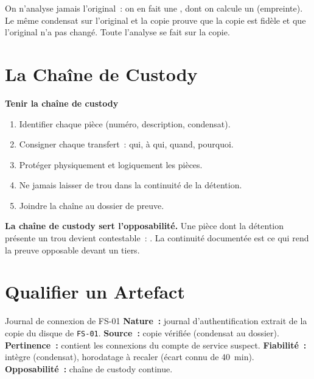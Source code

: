 On n'analyse jamais l'original~: on en fait une ,
dont on calcule un  (empreinte). Le même condensat sur
l'original et la copie prouve que la copie est fidèle et que l'original n'a
pas changé. Toute l'analyse se fait sur la copie.

\section{La Chaîne de Custody}
\label{sec:c11-custody}

\begin{boxprocedure}
\textbf{Tenir la chaîne de custody}
\begin{enumerate}
    \item Identifier chaque pièce (numéro, description, condensat).
    \item Consigner chaque transfert~: qui, à qui, quand, pourquoi.
    \item Protéger physiquement et logiquement les pièces.
    \item Ne jamais laisser de trou dans la continuité de la détention.
    \item Joindre la chaîne au dossier de preuve.
\end{enumerate}
\end{boxprocedure}

\begin{boxCRO}
\textbf{La chaîne de custody sert l'opposabilité.} Une pièce dont la
détention présente un trou devient contestable~: . La continuité
documentée est ce qui rend la preuve opposable devant un tiers.
\end{boxCRO}

\section{Qualifier un Artefact}
\label{sec:c11-artefact}

\begin{boxobjet}{Journal de connexion de FS-01}
\textbf{Nature~:} journal d'authentification extrait de la copie du disque de
\texttt{FS-01}. \textbf{Source~:} copie vérifiée (condensat au dossier).
\textbf{Pertinence~:} contient les connexions du compte de service suspect.
\textbf{Fiabilité~:} intègre (condensat), horodatage à recaler (écart connu
de 40~min). \textbf{Opposabilité~:} chaîne de custody continue.
\end{boxobjet}

